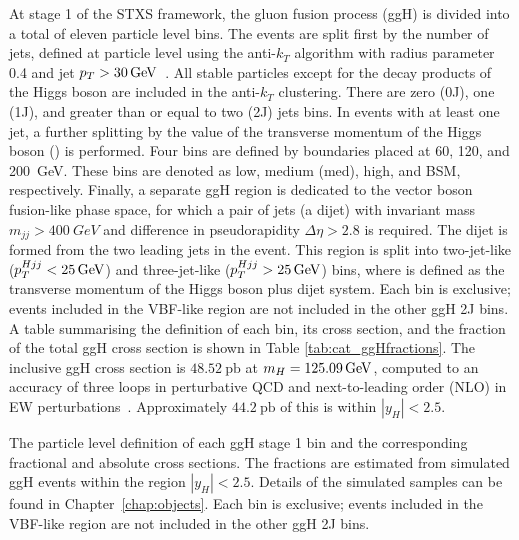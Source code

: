 At stage 1 of the STXS framework, 
the gluon fusion process (ggH) is divided into a total of eleven particle level bins.
The events are split first by the number of jets, 
defined at particle level using the anti-$k_T$ algorithm with radius parameter 0.4 
and jet $p_T > \SI{30}{GeV}$~\cite{AntiKt}.
All stable particles except for the decay products of the Higgs boson 
are included in the anti-$k_T$ clustering.
There are zero (0J), one (1J), and greater than or equal to two (2J) jets bins.
In events with at least one jet, a further splitting 
by the value of the transverse momentum of the Higgs boson (\ptH) is performed. 
Four bins are defined by boundaries placed at 60, 120, and \SI{200}{GeV}.
These bins are denoted as low, medium (med), high, and BSM, respectively.
Finally, a separate ggH region is dedicated to the vector boson fusion-like phase space, 
for which a pair of jets (a dijet) with invariant mass $m_{jj} > \SI{400}{GeV}$ 
and difference in pseudorapidity $\Delta\eta > 2.8$ is required.
The dijet is formed from the two leading jets in the event.
This region is split into two-jet-like ($p_T^{Hjj} < \SI{25}{GeV}$) 
and three-jet-like ($p_T^{Hjj} > \SI{25}{GeV}$) bins, 
where \ptHjj is defined as the transverse momentum of the Higgs boson plus dijet system.
Each bin is exclusive; events included in the VBF-like region are not included in the other ggH 2J bins.
A table summarising the definition of each bin, its cross section, and the fraction of the 
total ggH cross section is shown in Table \ref{tab:cat_ggHfractions}.
The inclusive ggH cross section is $48.52~\textrm{pb}$ at $m_{H} = \SI{125.09}{GeV}$, 
computed to an accuracy of three loops in perturbative QCD 
and next-to-leading order (NLO) in EW perturbations~\cite{YR4,Anastasiou2015,Anastasiou2016}.
Approximately $44.2~\textrm{pb}$ of this is within $|y_H| < 2.5$.

\begin{table}
  \begin{centering}
    
    \caption[Particle level definitions of the ggH stage 1 STXS bins.]
    {
      The particle level definition of each ggH stage 1 bin 
      and the corresponding fractional and absolute cross sections.
      The fractions are estimated from simulated ggH \Hgg events 
      within the region $|y_H| < 2.5$.
      Details of the simulated samples can be found in Chapter~\ref{chap:objects}.
      Each bin is exclusive; 
      events included in the VBF-like region are not included in the other ggH 2J bins.
    }
    \label{tab:cat_ggHfractions}
  \end{centering}
\end{table}

